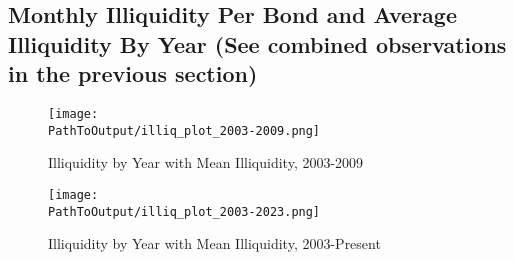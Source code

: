 \documentclass{article}
\newcommand*{\PathToOutput}{../output/}%
\begin{document}
\subsection{Monthly Illiquidity Per Bond and Average Illiquidity By Year (See combined observations in the previous section)}


\begin{figure}[hbt!]
\centering
\caption{Illiquidity by Year with Mean Illiquidity, 2003-2009}
  \centering
  \texttt{[image: \\PathToOutput/illiq\_plot\_2003-2009.png]}

\label{fig:illiq_plot_2003-2009}
\end{figure}


\begin{figure}[hbt!]
\centering
\caption{Illiquidity by Year with Mean Illiquidity, 2003-Present}
  \centering
  \texttt{[image: \\PathToOutput/illiq\_plot\_2003-2023.png]}

\label{fig:illiq_plot_2003-2023}
\end{figure}
\end{document}
